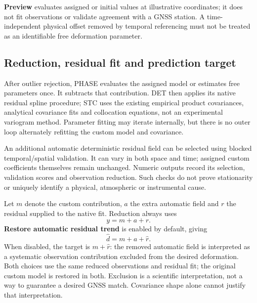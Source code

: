 \textbf{Preview} evaluates assigned or initial values at illustrative coordinates; it does not fit observations or validate agreement with a GNSS station. A time-independent physical offset removed by temporal referencing must not be treated as an identifiable free deformation parameter.

\subsection{Reduction, residual fit and prediction target}
After outlier rejection, PHASE evaluates the assigned model or estimates free parameters once. It subtracts that contribution. DET then applies its native residual spline procedure; STC uses the existing empirical product covariances, analytical covariance fits and collocation equations, not an experimental variogram method. Parameter fitting may iterate internally, but there is no outer loop alternately refitting the custom model and covariance.

An additional automatic deterministic residual field can be selected using blocked temporal/spatial validation. It can vary in both space and time; assigned custom coefficients themselves remain unchanged. Numeric outputs record its selection, validation scores and observation reduction. Such checks do not prove stationarity or uniquely identify a physical, atmospheric or instrumental cause.

Let $m$ denote the custom contribution, $a$ the extra automatic field and $r$ the residual supplied to the native fit. Reduction always uses
\begin{equation} y=m+a+r. \end{equation}
\textbf{Restore automatic residual trend} is enabled by default, giving
\begin{equation} \widehat d=m+\widehat a+\widehat r. \end{equation}
When disabled, the target is $m+\widehat r$: the removed automatic field is interpreted as a systematic observation contribution excluded from the desired deformation. Both choices use the same reduced observations and residual fit; the original custom model is restored in both. Exclusion is a scientific interpretation, not a way to guarantee a desired GNSS match. Covariance shape alone cannot justify that interpretation.

